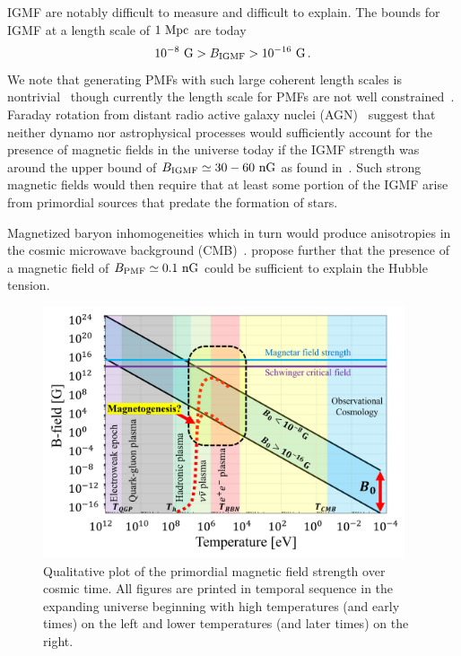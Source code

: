 IGMF are notably difficult to measure and difficult to explain. The bounds for IGMF at a length scale of $1{\rm\ Mpc}$ are today~\citep{Neronov:2010gir,Taylor:2011bn,Pshirkov:2015tua,Jedamzik:2018itu,Vernstrom:2021hru}
\begin{gather}
 \label{igmf}
 10^{-8}{\rm\ G}>B_\mathrm{IGMF}>10^{-16}{\rm\ G}\,.
\end{gather}
We note that generating PMFs with such large coherent length scales is nontrivial~\citep{Giovannini:2022rrl} though currently the length scale for PMFs are not well constrained~\citep{AlvesBatista:2021sln}. Faraday rotation from distant radio active galaxy nuclei (AGN)~\citep{Pomakov:2022cem} suggest that neither dynamo nor astrophysical processes would sufficiently account for the presence of magnetic fields in the universe today if the IGMF strength was around the upper bound of $B_\mathrm{IGMF}\simeq30-60{\rm\ nG}$ as found in~\cite{Vernstrom:2021hru}. Such strong magnetic fields would then require that at least some portion of the IGMF arise from primordial sources that predate the formation of stars.

Magnetized baryon inhomogeneities which in turn would produce anisotropies in the cosmic microwave background (CMB)~\citep{Jedamzik:2013gua,Abdalla:2022yfr}. \cite{Jedamzik:2020krr} propose further that the presence of a magnetic field of $B_\mathrm{PMF}\simeq0.1{\rm\ nG}$ could be sufficient to explain the Hubble tension.

\begin{figure}[h]
    \centering
    \includegraphics[width=0.95\textwidth]{plots/chap04cosmo/pmf.png}
    \caption{Qualitative plot of the primordial magnetic field strength over cosmic time. All figures are printed in temporal sequence in the expanding universe beginning with high temperatures (and early times) on the left and lower temperatures (and later times) on the right.}
    \label{fig:pmf}
\end{figure}

